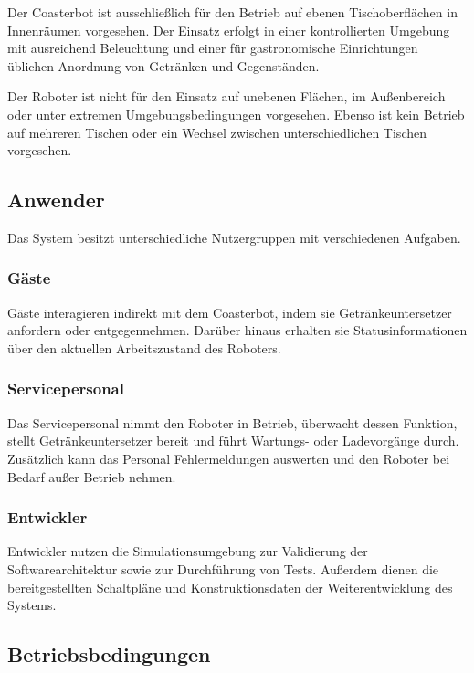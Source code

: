 Der Coasterbot ist ausschließlich für den Betrieb auf ebenen
Tischoberflächen in Innenräumen vorgesehen. Der Einsatz erfolgt in einer
kontrollierten Umgebung mit ausreichend Beleuchtung und einer für
gastronomische Einrichtungen üblichen Anordnung von Getränken und
Gegenständen.

Der Roboter ist nicht für den Einsatz auf unebenen Flächen, im
Außenbereich oder unter extremen Umgebungsbedingungen vorgesehen. Ebenso
ist kein Betrieb auf mehreren Tischen oder ein Wechsel zwischen
unterschiedlichen Tischen vorgesehen.

\subsection{Anwender}\label{anwender}

Das System besitzt unterschiedliche Nutzergruppen mit verschiedenen
Aufgaben.

\subsubsection{Gäste}\label{guxe4ste}

Gäste interagieren indirekt mit dem Coasterbot, indem sie
Getränkeuntersetzer anfordern oder entgegennehmen. Darüber hinaus
erhalten sie Statusinformationen über den aktuellen Arbeitszustand des
Roboters.

\subsubsection{Servicepersonal}\label{servicepersonal}

Das Servicepersonal nimmt den Roboter in Betrieb, überwacht dessen
Funktion, stellt Getränkeuntersetzer bereit und führt Wartungs- oder
Ladevorgänge durch. Zusätzlich kann das Personal Fehlermeldungen
auswerten und den Roboter bei Bedarf außer Betrieb nehmen.

\subsubsection{Entwickler}\label{entwickler}

Entwickler nutzen die Simulationsumgebung zur Validierung der
Softwarearchitektur sowie zur Durchführung von Tests. Außerdem dienen
die bereitgestellten Schaltpläne und Konstruktionsdaten der
Weiterentwicklung des Systems.

\subsection{Betriebsbedingungen}\label{betriebsbedingungen}

